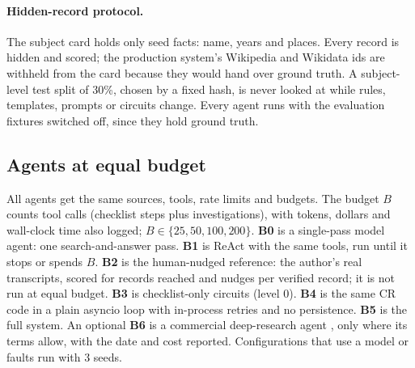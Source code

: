 \paragraph{Hidden-record protocol.} The subject card holds only seed facts: name, years and places. Every record is hidden and scored; the production system's Wikipedia and Wikidata ids are withheld from the card because they would hand over ground truth. A subject-level test split of 30\%, chosen by a fixed hash, is never looked at while rules, templates, prompts or circuits change. Every agent runs with the evaluation fixtures switched off, since they hold ground truth.

\subsection{Agents at equal budget}
All agents get the same sources, tools, rate limits and budgets. The budget $B$ counts tool calls (checklist steps plus investigations), with tokens, dollars and wall-clock time also logged; $B\in\{25,50,100,200\}$. \textbf{B0} is a single-pass model agent: one search-and-answer pass. \textbf{B1} is ReAct \citep{yao2023react} with the same tools, run until it stops or spends $B$. \textbf{B2} is the human-nudged reference: the author's real transcripts, scored for records reached and nudges per verified record; it is not run at equal budget. \textbf{B3} is checklist-only circuits (level 0). \textbf{B4} is the same CR code in a plain asyncio loop with in-process retries and no persistence. \textbf{B5} is the full system. An optional \textbf{B6} is a commercial deep-research agent \citep{openai2025deepresearch}, only where its terms allow, with the date and cost reported. Configurations that use a model or faults run with 3 seeds.

